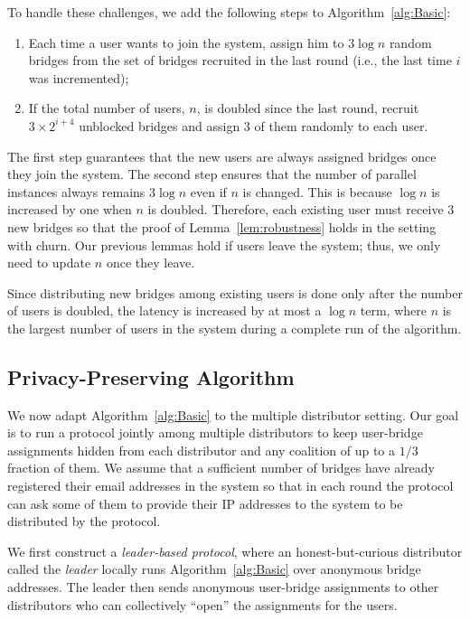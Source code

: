 \documentclass{sig-alternate-05-2015}
\newcommand{\ie}{i.e.}
\begin{document}
\noindent To handle these challenges, we	 add the following steps to Algorithm~\ref{alg:Basic}:

\begin{enumerate}[itemsep=0.5em, topsep=0.6em]
	\item Each time a user wants to join the system, assign him to $3\log{n}$ random bridges from the set of bridges recruited in the last round (\ie, the last time $i$ was incremented);
	
	\item If the total number of users, $n$, is doubled since the last round, recruit $3 \times 2^{i+4}$ unblocked bridges and assign $3$ of them randomly to each user.
\end{enumerate}

The first step guarantees that the new users are always assigned bridges once they join the system. The second step ensures that the number of parallel instances always remains $3\log{n}$ even if $n$ is changed. This is because $\log{n}$ is increased by one when $n$ is doubled. Therefore, each existing user must receive $3$ new bridges so that the proof of Lemma~\ref{lem:robustness} holds in the setting with churn. Our previous lemmas hold if users leave the system; thus, we only need to update $n$ once they leave.

Since distributing new bridges among existing users is done only after the number of users is doubled, the latency is increased by at most a $\log{n}$ term, where $n$ is the largest number of users in the system during a complete run of the algorithm.

\subsection{Privacy-Preserving Algorithm} \label{sec:multi-dist}
We now adapt Algorithm~\ref{alg:Basic} to the multiple distributor setting. Our goal is to run a protocol jointly among multiple distributors to keep user-bridge assignments hidden from each distributor and any coalition of up to a $1/3$ 	fraction of them. We assume that a sufficient number of bridges have already registered their email addresses in the system so that in each round the protocol can ask some of them to provide their IP addresses to the system to be distributed by the protocol.

We first construct a \emph{leader-based protocol}, where an honest-but-curious distributor called the \emph{leader} locally runs Algorithm~\ref{alg:Basic} over anonymous bridge addresses. The leader then sends anonymous user-bridge assignments to other distributors who can collectively ``open'' the assignments for the users. 
\end{document}
